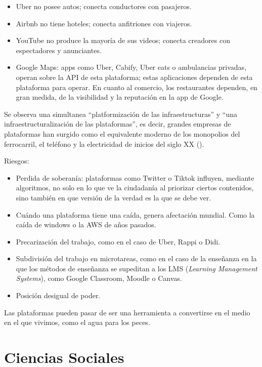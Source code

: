 \documentclass[
  letterpaper,
  DIV=11,
  numbers=noendperiod]{scrreprt}
\providecommand{\tightlist}{%
  \setlength{\itemsep}{0pt}\setlength{\parskip}{0pt}}\usepackage{longtable,booktabs,array}
\begin{document}
\begin{itemize}
\tightlist
\item
  Uber no posee autos; conecta conductores con pasajeros.
\item
  Airbnb no tiene hoteles; conecta anfitriones con viajeros.
\item
  YouTube no produce la mayoría de sus videos; conecta creadores con
  espectadores y anunciantes.
\item
  Google Maps: apps como Uber, Cabify, Uber eats o ambulancias privadas,
  operan sobre la API de esta plataforma; estas aplicaciones dependen de
  esta plataforma para operar. En cuanto al comercio, los restaurantes
  dependen, en gran medida, de la visibilidad y la reputación en la app
  de Google.
\end{itemize}

Se observa una simultanea ``platformización de las infraestructuras'' y
``una infraestructuralización de las plataformas'', es decir, grandes
empresas de plataformas han surgido como el equivalente moderno de los
monopolios del ferrocarril, el teléfono y la electricidad de inicios del
siglo XX ().

Riesgos:

\begin{itemize}
\tightlist
\item
  Perdida de soberanía: plataformas como Twitter o Tiktok influyen,
  mediante algoritmos, no solo en lo que ve la ciudadanía al priorizar
  ciertos contenidos, sino también en que versión de la verdad es la que
  se debe ver.
\item
  Cuándo una plataforma tiene una caída, genera afectación mundial. Como
  la caída de windows o la AWS de años pasados.
\item
  Precarización del trabajo, como en el caso de Uber, Rappi o Didi.
\item
  Subdivisión del trabajo en microtareas, como en el caso de la
  enseñanza en la que los métodos de enseñanza se supeditan a los LMS
  (\emph{Learning Management Systems}), como Google Classroom, Moodle o
  Canvas.
\item
  Posición desigual de poder.
\end{itemize}

Las plataformas pueden pasar de ser una herramienta a convertirse en el
medio en el que vivimos, como el agua para los peces.

\part{Ciencias Sociales}
\end{document}
